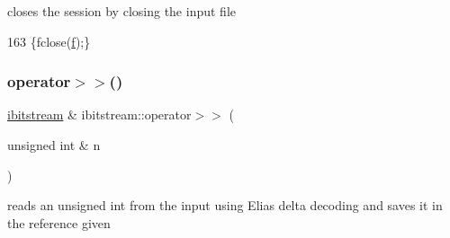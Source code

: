closes the session by closing the input file 


\begin{DoxyCode}
163 \{fclose(\hyperlink{classibitstream_a3ea2cdd0cf97820f0e1520c42e364308}{f});\}
\end{DoxyCode}
\mbox{\label{classibitstream_ae3e91ecc9ff17eef98d72d44aec02eca}} 
\subsubsection{\texorpdfstring{operator$>$$>$()}{operator>>()}\hspace{0.1cm}{\footnotesize\ttfamily [1/2]}}
{\footnotesize\ttfamily \hyperlink{classibitstream}{ibitstream} \& ibitstream\+::operator$>$$>$ (\begin{DoxyParamCaption}\item[{unsigned int \&}]{n }\end{DoxyParamCaption})}



reads an unsigned int from the input using Elias delta decoding and saves it in the reference given 


